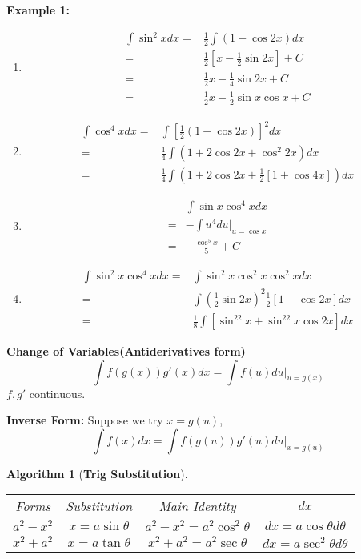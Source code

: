 \documentclass[12pt]{article}
\theoremstyle{plain}
\newtheorem{algorithm}{Algorithm}[subsection]
\begin{document}
	{\color{Brown}
		\textbf{Example 1:}
		\begin{enumerate}
		\item 
			\begin{align*}
				\int \sin^2x dx
				=& \frac12 \int(1-\cos 2x) dx\\
				=& \frac12 [x-\frac12 \sin 2x] + C\\
				=& \frac12 x - \frac 14 \sin 2x + C\\
				=& \frac12 x - \frac12 \sin x \cos x + C
			\end{align*}

		\item
			\begin{align*}
				\int \cos^4 x dx 
				=& \int[\frac12(1+\cos 2x)]^2 dx\\
				=& \frac 14 \int (1+ 2\cos 2x + \cos^2 2x) dx\\
				=& \frac 14 \int (1+2\cos 2x + \frac12[1+\cos4x]) dx
			\end{align*}

		\item 
			\begin{align*}
				&\int \sin x \cos^4 x dx \tag{$u = \cos x, du = -\sin xdx$}\\
				=& - \int u^4 du\vert_{u=\cos x} \\
				=& -\frac{\cos^5 x}5 + C
			\end{align*}
			
		\item
			\begin{align*}
				\int \sin^2x \cos^4 x dx
				=& \int \sin^2x\cos^2x\cos^2xdx\\
				=& \int (\frac12\sin2x)^2 \frac12[1+\cos 2x]dx\\
				=& \frac 18 \int[\sin^22x + \sin^22x\cos 2x] dx
			\end{align*}
		\end{enumerate}
	}

	\textbf{Change of Variables(Antiderivatives form)}
	\[
	\int f(g(x))g'(x)dx = \int f(u) du \vert_{u=g(x)}
	\]
	$f, g'$ continuous.

	\textbf{Inverse Form: }Suppose we try $x = g(u)$, 
	\[
		\int f(x) dx = \int f(g(u))g'(u) du\vert_{x=g(u)}
	\]

	\begin{algorithm}[\textbf{Trig Substitution}]
		$ $
		\begin{center}
		\begin{tabular}{c c c c}
			Forms &  Substitution & Main Identity & $dx$ \\
			$a^2-x^2$ & $x = a\sin \theta$ & $a^2 - x^2 = a^2 \cos ^2 \theta$
					  & $dx = a\cos \theta d\theta$\\
			$x^2+a^2$ & $x = a\tan \theta$ & $x^2+a^2=a^2\sec\theta$
					  & $dx = a\sec^2\theta d\theta$
		\end{tabular}
		\end{center}
	\end{algorithm}
\end{document}
